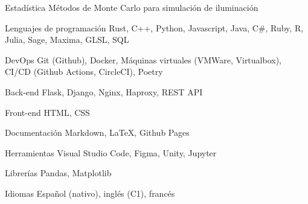 

\begin{cvskills}

  \cvskill
    {Estadística}
    {Métodos de Monte Carlo para simulación de iluminación}

  \cvskill
    {Lenguajes de programación} %
    {Rust, C++, Python, Javascript, Java, C\#, Ruby, R, Julia, Sage, Maxima, GLSL, SQL} %

  \cvskill
    {DevOps} %
    {Git (Github), Docker, Máquinas virtuales (VMWare, Virtualbox), CI/CD (Github Actions, CircleCI), Poetry} %

  \cvskill
    {Back-end} %
    {Flask, Django, Nginx, Haproxy, REST API} %

  \cvskill
    {Front-end} %
    {HTML, CSS} %

  \cvskill
    {Documentación}
    {Markdown, LaTeX, Github Pages}

  \cvskill
    {Herramientas}
    {Visual Studio Code, Figma, Unity, Jupyter}

  \cvskill
    {Librerías} %
    {Pandas, Matplotlib} %

  \cvskill
    {Idiomas} %
    {Español (nativo), inglés (C1), francés} %

\end{cvskills}
